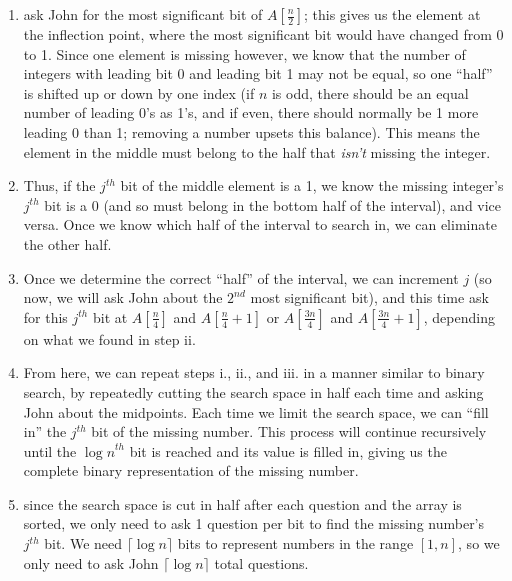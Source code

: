 \documentclass[12pt]{article}
\begin{document}
\begin{enumerate}
\begin{enumerate}
        \begin{enumerate}
            \item ask John for the most significant bit of $A[\frac{n}{2}]$; this gives us 
            the element at the inflection point, where the most significant bit would have changed from 0 to 1. Since one 
            element is missing however, we know that the number of integers with leading bit 0 and leading bit 1 may not be equal, 
            so one ``half'' is shifted up or down by one index (if $n$ is odd, there should be an equal number of leading 0's as 1's, 
            and if even, there should normally be 1 more leading 0 than 1; removing a number upsets this balance). This means the element in the middle must belong to the half 
            that \textit{isn't} missing the integer.
            \item Thus, if the $j^{th}$ bit of the middle element is a 1, we know the missing integer's $j^{th}$ bit is a 0 
            (and so must belong in the bottom half of the interval), and vice versa. Once we know which half of the interval to search in, we can eliminate 
            the other half.
            \item Once we determine the correct ``half'' of the interval, we can increment $j$ (so now, we will ask John about the $2^{nd}$ 
            most significant bit), and this time ask for this $j^{th}$ bit at $A[\frac{n}{4}]$ and $A[\frac{n}{4} + 1]$ or 
            $A[\frac{3n}{4}]$ and $A[\frac{3n}{4} + 1]$, depending on what we found in step ii.
            \item From here, we can repeat steps i., ii., and iii. in a manner similar to binary search, by repeatedly cutting 
            the search space in half each time and asking John about the midpoints. Each time we limit the search space, 
            we can ``fill in'' the $j^{th}$ bit of the missing number. This process will continue recursively until the ${\log n}^{th}$ bit is 
            reached and its value is filled in, giving us the complete binary representation of the missing number.
            \item since the search space is cut in half after each question and the array is sorted, we only need to ask 
            1 question per bit to find the missing number's $j^{th}$ bit. We need $\lceil\log n\rceil$ bits to represent 
            numbers in the range $[1, n]$, so we only need to ask John $\lceil\log n\rceil$ total questions.
        \end{enumerate}


\end{enumerate}
\end{enumerate}
\end{document}
